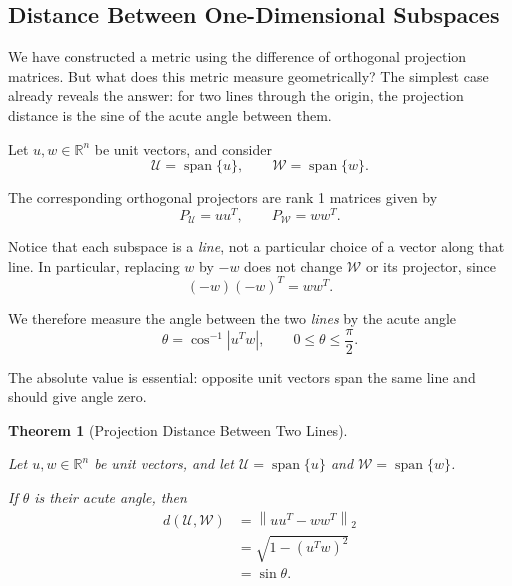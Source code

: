 \documentclass[14pt,letterpaper]{article}
\theoremstyle{plain}
\newtheorem{theorem}{Theorem}[section]
\theoremstyle{definition}
\theoremstyle{remark}
\newcommand{\R}{\mathbb{R}}
\newcommand{\norm}[1]{\left\lVert #1 \right\rVert}
\newcommand{\abs}[1]{\left| #1 \right|}
\DeclareMathOperator{\Span}{span}
\begin{document}

\subsection{Distance Between One-Dimensional Subspaces}
\label{subsec:one_dimensional_distance}

We have constructed a metric using the difference of
orthogonal projection matrices. But what does this
metric measure geometrically? The simplest case already
reveals the answer: for two lines through the origin,
the projection distance is the sine of the acute angle
between them.

Let $u,w\in\R^n$ be unit vectors, and consider
\[
\mathcal U=\Span\{u\},
\qquad
\mathcal W=\Span\{w\}.
\]

The corresponding orthogonal projectors are rank 1 matrices given by
\[
P_{\mathcal U}=uu^T,
\qquad
P_{\mathcal W}=ww^T.
\]

Notice that each subspace is a \emph{line}, not a
particular choice of a vector along that line. In
particular, replacing $w$ by $-w$ does not change
$\mathcal W$ or its projector, since
\[
(-w)(-w)^T=ww^T.
\]

We therefore measure the angle between the two
\emph{lines} by the acute angle
\[
\boxed{
\theta=\cos^{-1}\abs{u^Tw},
\qquad 0\leq\theta\leq\frac{\pi}{2}.
}
\]

The absolute value is essential: opposite unit vectors
span the same line and should give angle zero.

\begin{theorem}[Projection Distance Between Two Lines]
\label{thm:one_dimensional_distance}

Let $u,w\in\R^n$ be unit vectors, and let
$\mathcal U=\Span\{u\}$ and
$\mathcal W=\Span\{w\}$.

If $\theta$ is their acute angle, then
\[
\boxed{
\begin{aligned}
d(\mathcal U,\mathcal W)
&=\norm{uu^T-ww^T}_2\\
&=\sqrt{1-(u^Tw)^2}\\
&=\sin\theta.
\end{aligned}
}
\]

\end{theorem}
\end{document}
